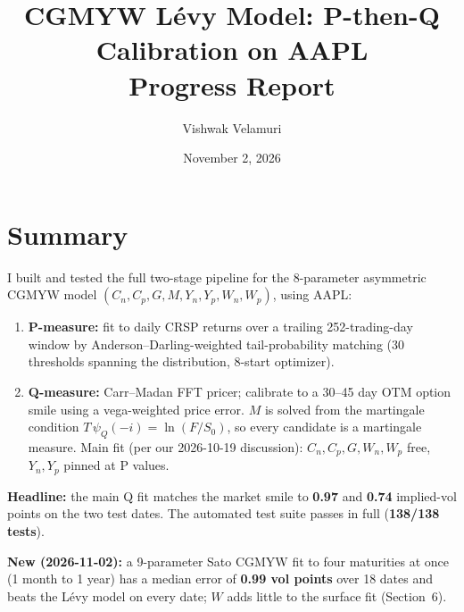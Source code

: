 \documentclass[11pt]{article}
\title{CGMYW Lévy Model: P-then-Q Calibration on AAPL\\\large Progress Report}
\author{Vishwak Velamuri}
\date{November 2, 2026}
\begin{document}
\maketitle

\section{Summary}
I built and tested the full two-stage pipeline for the 8-parameter asymmetric CGMYW model
$(C_n,C_p,G,M,Y_n,Y_p,W_n,W_p)$, using AAPL:
\begin{enumerate}
\item \textbf{P-measure:} fit to daily CRSP returns over a trailing 252-trading-day window by
Anderson--Darling-weighted tail-probability matching (30 thresholds spanning the distribution, 8-start optimizer).
\item \textbf{Q-measure:} Carr--Madan FFT pricer; calibrate to a 30--45 day OTM option smile using a
vega-weighted price error. $M$ is solved from the martingale condition
$T\,\psi_Q(-i)=\ln(F/S_0)$, so every candidate is a martingale measure. Main fit
(per our 2026-10-19 discussion): $C_n,C_p,G,W_n,W_p$ free, $Y_n,Y_p$ pinned at P values.
\end{enumerate}
\textbf{Headline:} the main Q fit matches the market smile to \textbf{0.97} and \textbf{0.74} implied-vol
points on the two test dates. The automated test suite passes in full (\textbf{138/138 tests}).

\textbf{New (2026-11-02):} a 9-parameter Sato CGMYW fit to four maturities at once (1 month to 1 year) has a median
error of \textbf{0.99 vol points} over 18 dates and beats the Lévy model on every date; $W$ adds little to the surface fit (Section~6).
\end{document}
